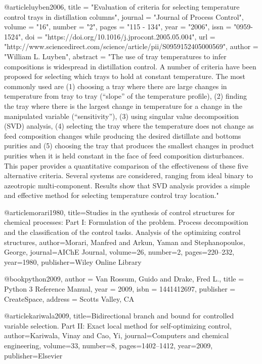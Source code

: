 @article{luyben2006,
title = "Evaluation of criteria for selecting temperature control trays in distillation columns",
journal = "Journal of Process Control",
volume = "16",
number = "2",
pages = "115 - 134",
year = "2006",
issn = "0959-1524",
doi = "https://doi.org/10.1016/j.jprocont.2005.05.004",
url = "http://www.sciencedirect.com/science/article/pii/S0959152405000569",
author = "William L. Luyben",
abstract = "The use of tray temperatures to infer compositions is widespread in distillation control. A number of criteria have been proposed for selecting which trays to hold at constant temperature. The most commonly used are (1) choosing a tray where there are large changes in temperature from tray to tray (“slope” of the temperature profile), (2) finding the tray where there is the largest change in temperature for a change in the manipulated variable (“sensitivity”), (3) using singular value decomposition (SVD) analysis, (4) selecting the tray where the temperature does not change as feed composition changes while producing the desired distillate and bottoms purities and (5) choosing the tray that produces the smallest changes in product purities when it is held constant in the face of feed composition disturbances. This paper provides a quantitative comparison of the effectiveness of these five alternative criteria. Several systems are considered, ranging from ideal binary to azeotropic multi-component. Results show that SVD analysis provides a simple and effective method for selecting temperature control tray location."
}

@article{morari1980,
  title={Studies in the synthesis of control structures for chemical processes: Part I: Formulation of the problem. Process decomposition and the classification of the control tasks. Analysis of the optimizing control structures},
  author={Morari, Manfred and Arkun, Yaman and Stephanopoulos, George},
  journal={AIChE Journal},
  volume={26},
  number={2},
  pages={220--232},
  year={1980},
  publisher={Wiley Online Library}
}

@book{python2009,
 author = {Van Rossum, Guido and Drake, Fred L.},
 title = {Python 3 Reference Manual},
 year = {2009},
 isbn = {1441412697},
 publisher = {CreateSpace},
 address = {Scotts Valley, CA}
}

@article{kariwala2009,
  title={Bidirectional branch and bound for controlled variable selection. Part II: Exact local method for self-optimizing control},
  author={Kariwala, Vinay and Cao, Yi},
  journal={Computers and chemical engineering},
  volume={33},
  number={8},
  pages={1402--1412},
  year={2009},
  publisher={Elsevier}
}

